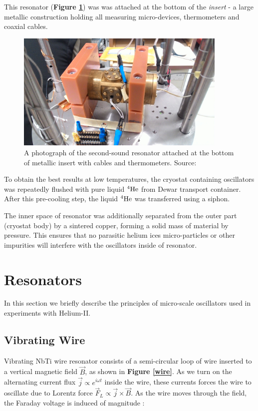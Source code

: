 This resonator (\textbf{Figure \ref{resonator}}) was  was attached at the bottom  of the \textit{insert} - a large metallic construction holding all measuring micro-devices, thermometers and coaxial cables.

\begin{figure}[h]
	\centering
	\includegraphics[width=0.9\textwidth]{graphics/exp/chamber}
	\caption{A photograph of the second-sound resonator attached at the bottom of metallic insert with cables and thermometers. Source: \cite{bakalaris}}
	\label{resonator}
\end{figure}

To obtain the best results at low temperatures, the cryostat containing oscillators was repeatedly flushed with pure liquid ${}^4\mathrm{He}$ from Dewar transport container. After this pre-cooling step, the liquid ${}^4\mathrm{He}$ was transferred using a siphon.

The inner space of resonator was additionally separated from the outer part (cryostat body) by a sintered copper, forming a solid mass of material by pressure. This ensures that no parasitic helium ices micro-particles or other impurities will interfere with the oscillators inside of resonator.


\newpage

\section{Resonators}

In this section we briefly describe the principles of micro-scale oscillators used in experiments with Helium-II.

\subsection{Vibrating Wire}

Vibrating NbTi wire resonator consists of a semi-circular loop of wire inserted to a vertical magnetic field $\vec{B}$, as shown in \textbf{Figure \ref{wire}}. As we turn on the alternating current flux $\vec{j} \propto e^{i\omega t}$ inside the wire, these currents forces the wire to oscillate due to Lorentz force $\vec{F}_L \propto \vec{j} \times \vec{B} $. As the wire moves through the field, the Faraday voltage is induced of magnitude \cite{wire}:

